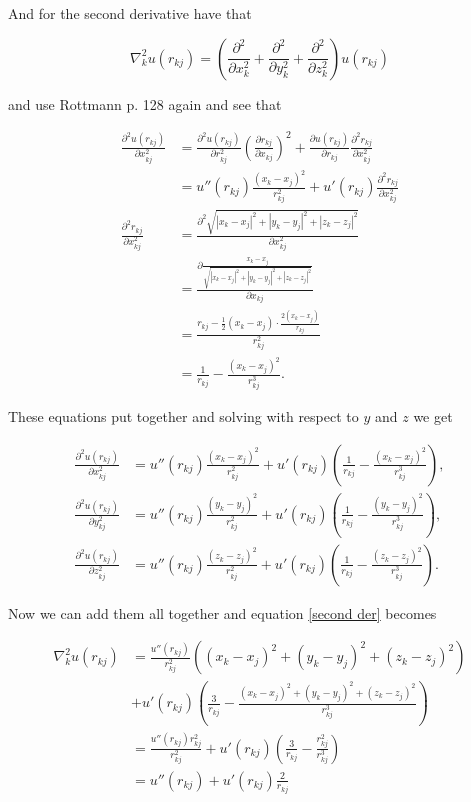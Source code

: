 And for the second derivative have that

\begin{equation} \label{second der}
\nabla_k^2 u(r_{kj}) = \left(\frac{\partial^2}{\partial x_k^2} + \frac{\partial^2}{\partial y_k^2} + \frac{\partial^2}{\partial z_k^2}\right) u(r_{kj})
\end{equation}

and use Rottmann p. 128 again and see that

\begin{align*}
\frac{\partial^2 u(r_{kj})}{\partial x_{kj}^2} &= \frac{\partial^2 u(r_{kj})}{\partial r_{kj}^2} \left(\frac{\partial r_{kj}}{\partial x_{kj}}\right)^2 + \frac{\partial u(r_{kj})}{\partial r_{kj}} \frac{\partial^2 r_{kj}}{\partial x_{kj}^2}\\
& =u''(r_{kj}) \frac{(x_k - x_j)^2}{r_{kj}^2} + u'(r_{kj}) \frac{\partial^2 r_{kj}}{\partial x_{kj}^2}\\
\frac{\partial^2 r_{kj}}{\partial x_{kj}^2} &= \frac{\partial^2 \sqrt{|x_k - x_j|^2 + |y_k - y_j|^2 + |z_k - z_j|^2}}{\partial x_{kj}^2}\\
&= \frac{\partial \frac{x_k - x_j}{\sqrt{|x_k - x_j|^2 + |y_k - y_j|^2 + |z_k - z_j|^2}}}{\partial x_{kj}}\\
&= \frac{r_{kj} - \frac{1}{2} (x_k - x_j) \cdot \frac{2(x_k - x_j)}{r_{kj}}}{r_{kj}^2}\\
&= \frac{1}{r_{kj}} - \frac{(x_k - x_j)^2}{r_{kj}^3}.
\end{align*}

These equations put together and solving with respect to $y$ and $z$ we get 

\begin{align*}
\frac{\partial^2 u(r_{kj})}{\partial x_{kj}^2} &= u''(r_{kj}) \frac{(x_k - x_j)^2}{r_{kj}^2} + u'(r_{kj}) \left(\frac{1}{r_{kj}} - \frac{(x_k - x_j)^2}{r_{kj}^3}\right),\\
\frac{\partial^2 u(r_{kj})}{\partial y_{kj}^2} &= u''(r_{kj}) \frac{(y_k - y_j)^2}{r_{kj}^2} + u'(r_{kj}) \left(\frac{1}{r_{kj}} - \frac{(y_k - y_j)^2}{r_{kj}^3}\right),\\
\frac{\partial^2 u(r_{kj})}{\partial z_{kj}^2} &= u''(r_{kj}) \frac{(z_k - z_j)^2}{r_{kj}^2} + u'(r_{kj}) \left(\frac{1}{r_{kj}} - \frac{(z_k - z_j)^2}{r_{kj}^3}\right).
\end{align*}

Now we can add them all together and equation \eqref{second der} becomes

\begin{align*}
\nabla_k^2 u(r_{kj}) &= \frac{u''(r_{kj})}{r_{kj}^2} ((x_k - x_j)^2 + (y_k - y_j)^2 + (z_k - z_j)^2) \\
&+ u'(r_{kj}) \left(\frac{3}{r_{kj}} - \frac{(x_k - x_j)^2 + (y_k - y_j)^2 + (z_k - z_j)^2}{r_{kj}^3}\right)\\
&= \frac{u''(r_{kj}) r_{kj}^2}{r_{kj}^2} + u'(r_{kj}) \left( \frac{3}{r_{kj}} - \frac{r_{kj}^2}{r_{kj}^3}\right)\\
&= u''(r_{kj}) + u'(r_{kj})\frac{2}{r_{kj}}
\end{align*}

